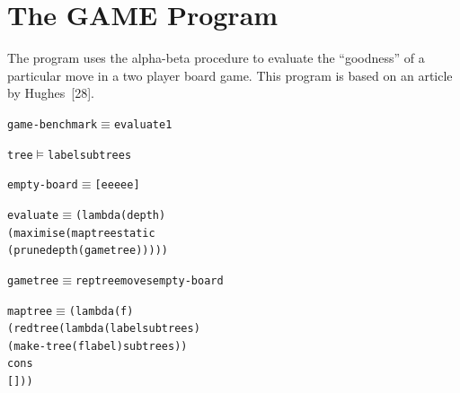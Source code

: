 \section{The GAME Program}

The  program uses the alpha-beta procedure to evaluate the ``goodness'' of a
particular move in a two player board game. This program is based on an article
by Hughes~[28].
\par\medskip
\noindent\begin{minipage}{\linewidth}
\begin{alltt}
game-benchmark \(\equiv\) evaluate 1
\end{alltt}
\end{minipage}\par\bigskip

\noindent\begin{minipage}{\linewidth}
\begin{alltt}
tree \(\vDash\) label subtrees
\end{alltt}
\end{minipage}\par\bigskip

\noindent\begin{minipage}{\linewidth}
\begin{alltt}
empty-board \(\equiv\) [e e e e e]
\end{alltt}
\end{minipage}\par\bigskip

\noindent\begin{minipage}{\linewidth}
\begin{alltt}
evaluate \(\equiv\) (lambda (depth)
             (maximise (maptree static
                                (prune depth (gametree)))))
\end{alltt}
\end{minipage}\par\bigskip

\noindent\begin{minipage}{\linewidth}
\begin{alltt}
gametree \(\equiv\) reptree moves empty-board
\end{alltt}
\end{minipage}\par\bigskip

\noindent\begin{minipage}{\linewidth}
\begin{alltt}
maptree \(\equiv\) (lambda (f)
            (redtree (lambda (label subtrees)
                       (make-tree (f label) subtrees))
                     cons
                     []))
\end{alltt}
\end{minipage}\par\bigskip

